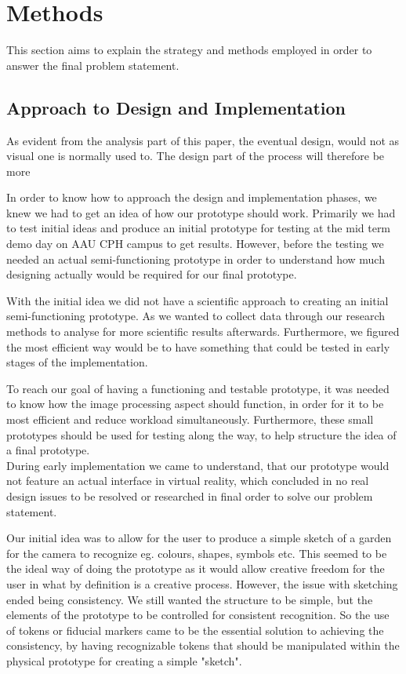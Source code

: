 \chapter{Methods}
This section aims to explain the strategy and methods employed in order to answer the final problem statement. 

\section{Approach to Design and Implementation}
	As evident from the analysis part of this paper, the eventual design, would not as visual one is normally used to. The design part of the process will therefore be more

In order to know how to approach the design and implementation phases, we knew we had to get an idea of how our prototype should work. Primarily we had to test initial ideas and produce an initial prototype for testing at the mid term demo day on AAU CPH campus to get results. However, before the testing we needed an actual semi-functioning prototype in order to understand how much designing actually would be required for our final prototype.

With the initial idea we did not have a scientific approach to creating an initial semi-functioning prototype. As we wanted to collect data through our research methods to analyse for more scientific results afterwards. Furthermore, we figured the most efficient way would be to have something that could be tested in early stages of the implementation.

To reach our goal of having a functioning and testable prototype, it was needed to know how the image processing aspect should function, in order for it to be most efficient and reduce workload simultaneously. Furthermore, these small prototypes should be used for testing along the way, to help structure the idea of a final prototype. \\

During early implementation we came to understand, that our prototype would not feature an actual interface in virtual reality, which concluded in no real design issues to be resolved or researched in final order to solve our problem statement. 

Our initial idea was to allow for the user to produce a simple sketch of a garden for the camera to recognize eg. colours, shapes, symbols etc. This seemed to be the ideal way of doing the prototype as it would allow creative freedom for the user in what by definition is a creative process. However, the issue with sketching ended being consistency. We still wanted the structure to be simple, but the elements of the prototype to be controlled for consistent recognition. So the use of tokens or fiducial markers came to be the essential solution to achieving the consistency, by having recognizable tokens that should be manipulated within the physical prototype for creating a simple "sketch".

